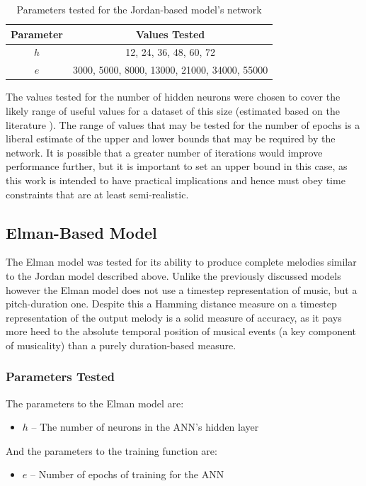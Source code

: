 \documentclass[ author={Stephen Livermore-Tozer},
				supervisor={Dr. Peter Flach},
				degree={MEng},
				title={Algorithmic Co-composition Using Machine Learning},
				subtitle={},
				type={research},
				year={2016} ]{dissertation}
\begin{document}
	\begin{table}[h]
		\begin{center}
			\begin{tabular}{cc}
				\toprule
				Parameter & Values Tested\\
				\hline
				$h$ & 12, 24, 36, 48, 60, 72\\
				$e$ & 3000, 5000, 8000, 13000, 21000, 34000, 55000\\
				\bottomrule
			\end{tabular}
		\end{center}
		\caption{Parameters tested for the Jordan-based model's network}
		\label{tab:jordan-net-parameters}
	\end{table}
	
	The values tested for the number of hidden neurons were chosen to cover the likely range of useful values for a dataset of this size (estimated based on the literature \cite{todd1989connectionist}). The range of values that may be tested for the number of epochs is a liberal estimate of the upper and lower bounds that may be required by the network. It is possible that a greater number of iterations would improve performance further, but it is important to set an upper bound in this case, as this work is intended to have practical implications and hence must obey time constraints that are at least semi-realistic.
	
	\subsection{Elman-Based Model}
	
	The Elman model was tested for its ability to produce complete melodies similar to the Jordan model described above. Unlike the previously discussed models however the Elman model does not use a timestep representation of music, but a pitch-duration one. Despite this a Hamming distance measure on a timestep representation of the output melody is a solid measure of accuracy, as it pays more heed to the absolute temporal position of musical events (a key component of musicality) than a purely duration-based measure.
	
	\subsubsection{Parameters Tested}
	
	The parameters to the Elman model are:
	\begin{itemize}
		\item $h$ -- The number of neurons in the ANN's hidden layer
	\end{itemize}
	And the parameters to the training function are:
	\begin{itemize}
		\item $e$ -- Number of epochs of training for the ANN
	\end{itemize}
	
\end{document}
